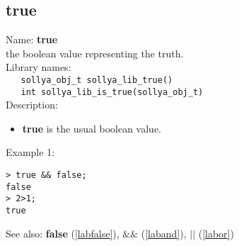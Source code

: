 \subsection{true}
\label{labtrue}
\noindent Name: \textbf{true}\\
\phantom{aaa}the boolean value representing the truth.\\[0.2cm]
\noindent Library names:\\
\verb|   sollya_obj_t sollya_lib_true()|\\
\verb|   int sollya_lib_is_true(sollya_obj_t)|\\[0.2cm]
\noindent Description: \begin{itemize}

\item \textbf{true} is the usual boolean value.
\end{itemize}
\noindent Example 1: 
\begin{center}\begin{minipage}{15cm}\begin{Verbatim}[frame=single,commandchars=\\\|\~]
> true && false;
false
> 2>1;
true
\end{Verbatim}
\end{minipage}\end{center}
See also: \textbf{false} (\ref{labfalse}), \textbf{$\&\&$} (\ref{laband}), \textbf{$||$} (\ref{labor})
